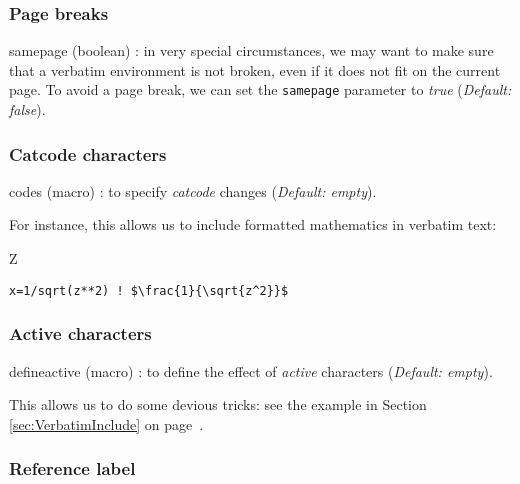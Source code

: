 \documentclass[twoside]{article}
\providecommand\optname[1]{\textsf{#1}}
\newenvironment{optlist}{\begin{description}%
  \renewcommand\makelabel[1]{%
    \descriptionlabel{\mdseries\optname{##1}}}%
  \itemsep0.25\itemsep}%
 {\end{description}}
\begin{document}
\subsubsection{Page breaks}

\begin{optlist}
  \item[samepage (boolean)]: in very special circumstances, we may want to
  make sure that a verbatim environment is not broken, even if it does not
  fit on the current page. To avoid a page break, we can set the
  \texttt{samepage} parameter to \emph{true} (\emph{Default: false}).
\end{optlist}

\subsubsection{Catcode characters}

\begin{optlist}
  \item[codes (macro)]: to specify \emph{catcode} changes (\emph{Default:
  empty}).
\end{optlist}

  For instance, this allows us to include formatted mathematics in verbatim
text:

{
\begin{SideBySideExample}
  Z
  \begin{Verbatim}[commandchars=\\\{\},
         codes={\catcode`$=3\catcode`^=7}]
    x=1/sqrt(z**2) ! $\frac{1}{\sqrt{z^2}}$
  \end{Verbatim}
\end{SideBySideExample}
}  %


\subsubsection{Active characters}

\begin{optlist}
  \item[defineactive (macro)]: to define the effect of \emph{active}
  characters
  (\emph{Default: empty}).
\end{optlist}

  This allows us to do some devious tricks: see the example in Section
\ref{sec:VerbatimInclude} on page~\pageref{sec:VerbatimInclude}.


\subsubsection{Reference label}
\end{document}
